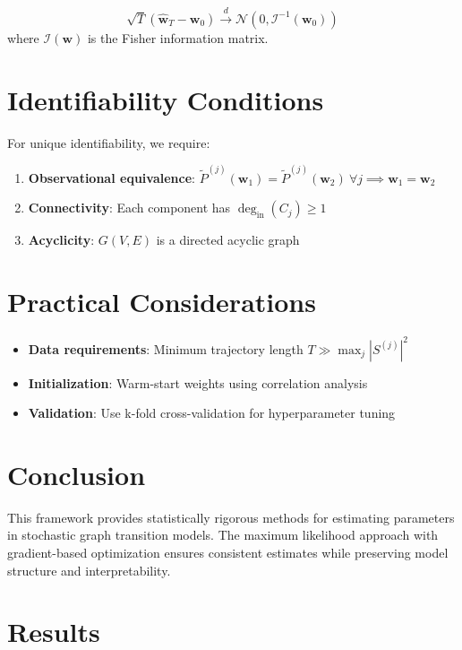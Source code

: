\documentclass[answers,12pt,addpoints]{exam}
\begin{document}
\begin{theorem}
\begin{equation}
\sqrt{T} (\hat{\mathbf{w}}_T - \mathbf{w}_0) \xrightarrow{d} \mathcal{N}(0, \mathcal{I}^{-1}(\mathbf{w}_0))
\end{equation}
where $\mathcal{I}(\mathbf{w})$ is the Fisher information matrix.
\end{theorem}

\section{Identifiability Conditions}
For unique identifiability, we require:
\begin{enumerate}
    \item \textbf{Observational equivalence}: $\widetilde{P}^{(j)}(\mathbf{w}_1) = \widetilde{P}^{(j)}(\mathbf{w}_2) \: \forall j \implies \mathbf{w}_1 = \mathbf{w}_2$
    \item \textbf{Connectivity}: Each component has $\deg_{\text{in}}(C_j) \geq 1$
    \item \textbf{Acyclicity}: $G(V,E)$ is a directed acyclic graph
\end{enumerate}

\section{Practical Considerations}
\begin{itemize}
    \item \textbf{Data requirements}: Minimum trajectory length $T \gg \max_j |S^{(j)}|^2$
    \item \textbf{Initialization}: Warm-start weights using correlation analysis
    \item \textbf{Validation}: Use k-fold cross-validation for hyperparameter tuning
\end{itemize}

\section{Conclusion}
This framework provides statistically rigorous methods for estimating parameters in stochastic graph transition models. The maximum likelihood approach with gradient-based optimization ensures consistent estimates while preserving model structure and interpretability.



\section{Results}
\end{document}
